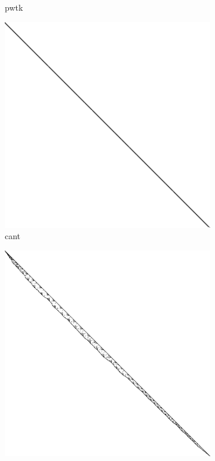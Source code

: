 \begin{figure}
\begin{multicols}{3}
\begin{subfigure}{\linewidth}
\caption{pwtk}
\end{subfigure}
\begin{subfigure}{\linewidth}
\includegraphics[width=\linewidth]{images/cant}
\caption{cant}
\end{subfigure}
\end{multicols}
\begin{multicols}{3}
\begin{subfigure}{\linewidth}
\includegraphics[width=\linewidth]{images/shipsec1}

\end{subfigure}
\end{multicols}
\end{figure}
